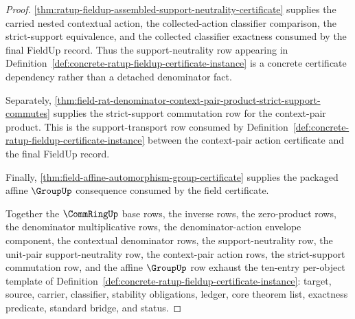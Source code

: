 \begin{proof}
\autoref{thm:ratup-fieldup-assembled-support-neutrality-certificate} supplies
the carried nested contextual action, the collected-action classifier
comparison, the strict-support equivalence, and the collected classifier
exactness consumed by the final FieldUp record. Thus the support-neutrality row
appearing in
Definition~\ref{def:concrete-ratup-fieldup-certificate-instance} is a concrete
certificate dependency rather than a detached denominator fact.

Separately,
\autoref{thm:field-rat-denominator-context-pair-product-strict-support-commutes}
supplies the strict-support commutation row for the context-pair product. This
is the support-transport row consumed by
Definition~\ref{def:concrete-ratup-fieldup-certificate-instance} between the
context-pair action certificate and the final FieldUp record.

Finally, \autoref{thm:field-affine-automorphism-group-certificate} supplies
the packaged affine $\GroupUp$ consequence consumed by the field certificate.

Together the $\CommRingUp$ base rows, the inverse rows, the zero-product rows,
the denominator multiplicative rows, the denominator-action envelope component,
the contextual denominator rows, the support-neutrality row, the unit-pair
support-neutrality row, the context-pair action rows, the strict-support
commutation row, and the affine $\GroupUp$ row
exhaust the ten-entry per-object template of
Definition~\ref{def:concrete-ratup-fieldup-certificate-instance}: target,
source, carrier, classifier, stability obligations, ledger, core theorem list,
exactness predicate, standard bridge, and status.
\end{proof}

